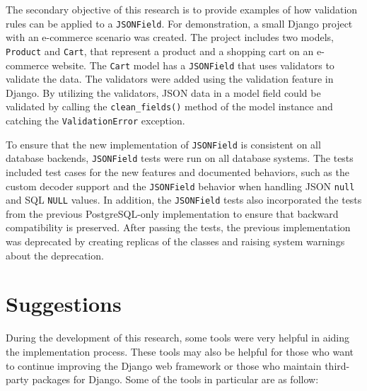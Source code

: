 The secondary objective of this research is to provide examples of how
validation rules can be applied to a \verb|JSONField|. For demonstration, a
small Django project with an e-commerce scenario was created. The project
includes two models, \verb|Product| and \verb|Cart|, that represent a product
and a shopping cart on an e-commerce website. The \verb|Cart| model has a
\verb|JSONField| that uses validators to validate the data. The validators were
added using the validation feature in Django. By utilizing the validators, JSON
data in a model field could be validated by calling the \verb|clean_fields()|
method of the model instance and catching the \verb|ValidationError| exception.

To ensure that the new implementation of \verb|JSONField| is consistent on all
database backends, \verb|JSONField| tests were run on all database systems. The
tests included test cases for the new features and documented behaviors, such
as the custom decoder support and the \verb|JSONField| behavior when handling
JSON \verb|null| and SQL \verb|NULL| values. In addition, the \verb|JSONField|
tests also incorporated the tests from the previous PostgreSQL-only
implementation to ensure that backward compatibility is preserved. After
passing the tests, the previous implementation was deprecated by creating
replicas of the classes and raising system warnings about the deprecation.

\section{Suggestions}

During the development of this research, some tools were very helpful in aiding
the implementation process. These tools may also be helpful for those who want
to continue improving the Django web framework or those who maintain
third-party packages for Django. Some of the tools in particular are as follow:

